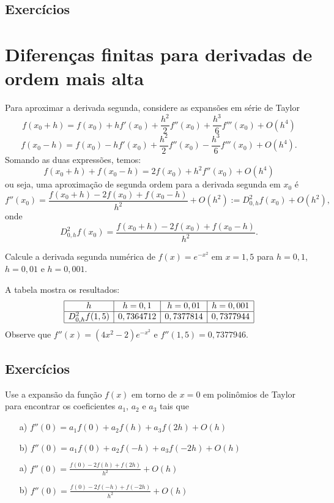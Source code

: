 \subsection*{Exercícios}

\emconstrucao

\section{Diferenças finitas para derivadas de ordem mais alta}

Para aproximar a derivada segunda, considere as expansões em série de Taylor
$$
f(x_0+h)=f(x_0)+hf'(x_0)+\frac{h^2}{2}f''(x_0)+\frac{h^3}{6}f'''(x_0)+O(h^4)
$$
$$
f(x_0-h)=f(x_0)-hf'(x_0)+\frac{h^2}{2}f''(x_0)-\frac{h^3}{6}f'''(x_0)+O(h^4).
$$
Somando as duas expressões, temos:
$$
f(x_0+h)+f(x_0-h)=2f(x_0)+h^2f''(x_0)+O(h^4)
$$
ou seja, uma aproximação de segunda ordem para a derivada segunda em $x_0$ é
$$
f''(x_0)=\frac{f(x_0+h)-2f(x_0)+f(x_0-h)}{h^2}+O(h^2):=D^2_{0,h}f(x_0)+O(h^2),
$$
onde
$$
D^2_{0,h}f(x_0)=\frac{f(x_0+h)-2f(x_0)+f(x_0-h)}{h^2}.
$$
\begin{ex}
Calcule a derivada segunda numérica de $f(x)=e^{-x^2}$ em $x=1,5$ para $h=0,1$, $h=0,01$ e $h=0,001$.
\end{ex}
\begin{sol}
A tabela mostra os resultados:
$$
\begin{array}{|c|c|c|c|}
\hline
 h&h=0,1& h=0,01 & h=0,001\\
\hline
D^2_{0,h}f(1,5) & 0,7364712 & 0,7377814 & 0,7377944\\
\hline
\end{array}
$$
Observe que $f''(x)=(4x^2-2)e^{-x^2}$ e $f''(1,5)=0,7377946$.  
\end{sol}

\subsection*{Exercícios}

\begin{exer} Use a expansão da função $f(x)$ em torno de $x=0$ em polinômios de Taylor para encontrar os coeficientes $a_1$, $a_2$ e $a_3$ tais que
\begin{itemize}
\item[a)] $f''(0)=a_1f(0)+a_2f(h)+a_3f(2h) + O(h)$
\item[b)] $f''(0)=a_1f(0)+a_2f(-h)+a_3f(-2h) + O(h)$
\end{itemize}
\end{exer}
\begin{resp}
  
\begin{itemize}
\item[a)] $f''(0)=\frac{f(0)-2f(h)+f(2h)}{h^2}+O(h)$
\item[b)] $f''(0)=\frac{f(0)-2f(-h)+f(-2h)}{h^2}+O(h)$
\end{itemize}    
  
\end{resp}

